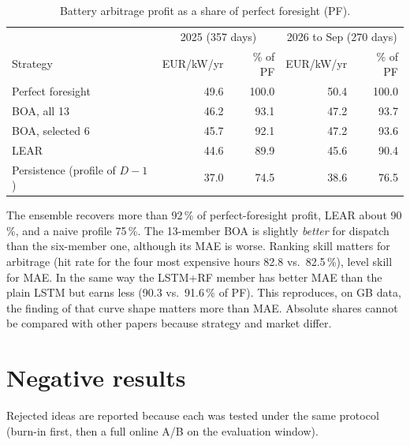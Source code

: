\documentclass[11pt,a4paper]{article}
\begin{document}
\begin{table}[ht]
\centering\small
\begin{tabular}{lrrrr}
\toprule
 & \multicolumn{2}{c}{2025 (357 days)} & \multicolumn{2}{c}{2026 to Sep (270 days)}\\
Strategy & EUR/kW/yr & \% of PF & EUR/kW/yr & \% of PF\\
\midrule
Perfect foresight & 49.6 & 100.0 & 50.4 & 100.0\\
BOA, all 13 & 46.2 & 93.1 & 47.2 & 93.7\\
BOA, selected 6 & 45.7 & 92.1 & 47.2 & 93.6\\
LEAR & 44.6 & 89.9 & 45.6 & 90.4\\
Persistence (profile of $D\!-\!1$) & 37.0 & 74.5 & 38.6 & 76.5\\
\bottomrule
\end{tabular}
\caption{Battery arbitrage profit as a share of perfect foresight (PF).}
\label{tab:bess}
\end{table}

The ensemble recovers more than 92\,\% of perfect-foresight profit, LEAR about 90\,\%, and a naive profile 75\,\%. The 13-member BOA is slightly \emph{better} for dispatch than the six-member one, although its MAE is worse. Ranking skill matters for arbitrage (hit rate for the four most expensive hours 82.8 vs.\ 82.5\,\%), level skill for MAE. In the same way the LSTM+RF member has better MAE than the plain LSTM but earns less (90.3 vs.\ 91.6\,\% of PF). This reproduces, on GB data, the finding of \citet{maciejowska2026} that curve shape matters more than MAE. Absolute shares cannot be compared with other papers because strategy and market differ.

\section{Negative results}
\label{sec:negative}

Rejected ideas are reported because each was tested under the same protocol (burn-in first, then a full online A/B on the evaluation window).
\end{document}
